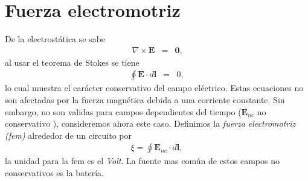 \documentclass[11pt,fleqn]{book} %
\begin{document}
\section{Fuerza electromotriz}
De la electrost\'atica se sabe
\begin{eqnarray}
\nabla\times\textbf{E}&=&\textbf{0},\nonumber
\end{eqnarray}
al usar el teorema de Stokes se tiene
\begin{eqnarray}
\oint\textbf{E}\cdot d\textbf{l}&=&0,\nonumber
\end{eqnarray}
lo cual muestra el car\'acter conservativo del campo el\'ectrico. Estas ecuaciones no son afectadas por la fuerza magn\'etica debida a una corriente constante. Sin embargo, no son validas para campos dependientes del tiempo ($\textbf{E}_{nc}$ no conservativo ), consideremos ahora este caso. Definimos la \emph{fuerza electromotriz (fem)} alrededor de un circuito por
\begin{eqnarray}
\xi=\oint\textbf{E}_{nc}\cdot d\textbf{l},\label{fza electrom}
\end{eqnarray}
la unidad para la fem es el \emph{Volt}. La fuente mas com\'un de estos campos no conservativos es la bater\'ia.



\end{document}
